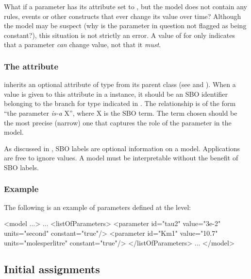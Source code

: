 What if a parameter has its  attribute set to
, but the model does not contain any rules, events or
other constructs that ever change its value over time?  Although
the model may be suspect (why is the parameter in question not
flagged as being constant?), this situation is not strictly an
error.  A value of  for  only indicates
that a parameter \emph{can} change value, not that it \emph{must}.


\subsubsection{The  attribute}
\label{sec:parameter-sboterm}

\Parameter inherits an optional 
attribute of type  from its parent
class \SBase (see 
and ).  When a value is given to this
attribute in a \Parameter instance, it should be an
SBO identifier belonging to the branch for type \Parameter 
indicated in .  The relationship is
of the form ``the parameter \emph{is-a} X'', where X is
the SBO term.  The term chosen should be the most precise (narrow)
one that captures the role of the parameter in the model.

As discussed in , SBO labels are optional
information on a model.  Applications are free to ignore
 values.  A model must be interpretable without the
benefit of SBO labels.


\subsubsection{Example}

The following is an example of parameters defined at the \Model level:

\begin{example}
<model ...>
    ...
    <listOfParameters>
        <parameter id="tau2" value="3e-2" units="second"        constant="true"/>
        <parameter id="Km1"  value="10.7" units="molesperlitre" constant="true"/>
    </listOfParameters>
    ...
</model>
\end{example}
\vspace*{-0.75ex}

\subsection{Initial assignments}
\label{sec:initialAssignment}

